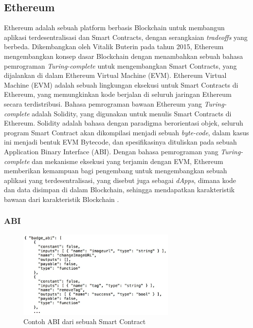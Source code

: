 \subsection{Ethereum}
\label{subsec:ethereum}

Ethereum adalah sebuah platform berbasis Blockchain untuk membangun aplikasi terdesentralisasi dan Smart Contracts, dengan serangkaian \textit{tradeoffs} yang berbeda. Dikembangkan oleh Vitalik Buterin pada tahun 2015, Ethereum mengembangkan konsep dasar Blockchain dengan menambahkan sebuah bahasa pemrograman \textit{Turing-complete} untuk mengembangkan Smart Contracts, yang dijalankan di dalam Ethereum Virtual Machine (EVM). Ethereum Virtual Machine (EVM) adalah sebuah lingkungan eksekusi untuk Smart Contracts di Ethereum, yang memungkinkan kode berjalan di seluruh jaringan Ethereum secara terdistribusi. Bahasa pemrograman bawaan Ethereum yang \textit{Turing-complete} adalah Solidity, yang digunakan untuk menulis Smart Contracts di Ethereum. Solidity adalah bahasa dengan paradigma berorientasi objek, seluruh program Smart Contract akan dikompilasi menjadi sebuah \textit{byte-code}, dalam kasus ini menjadi bentuk EVM Bytecode, dan spesifikasinya dituliskan pada sebuah Application Binary Interface (ABI). Dengan bahasa pemrograman yang \textit{Turing-complete} dan mekanisme eksekusi yang terjamin dengan EVM, Ethereum memberikan kemampuan bagi pengembang untuk mengembangkan sebuah aplikasi yang terdesentralisasi, yang disebut juga sebagai \textit{dApps}, dimana kode dan data disimpan di dalam Blockchain, sehingga mendapatkan karakteristik bawaan dari karakteristik Blockchain \parencite{buterin2013ethereum}.

\subsubsection{ABI}
\label{subsubsec:abi}

\begin{figure}[ht]
  \centering
  \includegraphics[width=0.7\textwidth]{resources/chapter-2/smart-contract-abi.jpg}
  \caption{Contoh ABI dari sebuah Smart Contract \parencite{third2017linked}}
  \label{image:abi-example}
\end{figure}

